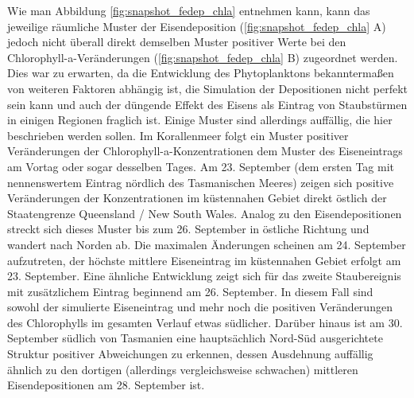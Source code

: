 \documentclass[12pt,a4paper,onecolumn,draft]{scrartcl}
\begin{document}
Wie man Abbildung \ref{fig:snapshot_fedep_chla} entnehmen kann, kann das jeweilige räumliche Muster der Eisendeposition (\ref{fig:snapshot_fedep_chla} A) jedoch nicht überall direkt demselben Muster positiver Werte bei den Chlorophyll-a-Veränderungen (\ref{fig:snapshot_fedep_chla} B) zugeordnet werden. Dies war zu erwarten, da die Entwicklung des Phytoplanktons bekanntermaßen von weiteren Faktoren abhängig ist, die Simulation der Depositionen nicht perfekt sein kann und auch der düngende Effekt des Eisens als Eintrag von Staubstürmen in einigen Regionen fraglich ist. Einige Muster sind allerdings auffällig, die hier beschrieben werden sollen. Im Korallenmeer folgt ein Muster positiver Veränderungen der Chlorophyll-a-Konzentrationen dem Muster des Eiseneintrags am Vortag oder sogar desselben Tages. Am 23. September (dem ersten Tag mit nennenswertem Eintrag nördlich des Tasmanischen Meeres) zeigen sich positive Veränderungen der Konzentrationen im küstennahen Gebiet direkt östlich der Staatengrenze Queensland / New South Wales. Analog zu den Eisendepositionen streckt sich dieses Muster bis zum 26. September in östliche Richtung und wandert nach Norden ab. Die maximalen Änderungen scheinen am 24. September aufzutreten, der höchste mittlere Eiseneintrag im küstennahen Gebiet erfolgt am 23. September. Eine ähnliche Entwicklung zeigt sich für das  zweite Staubereignis mit zusätzlichem Eintrag beginnend am 26. September. In diesem Fall sind sowohl der simulierte Eiseneintrag und mehr noch die positiven Veränderungen des Chlorophylls im gesamten Verlauf etwas südlicher. Darüber hinaus ist am 30. September südlich von Tasmanien eine hauptsächlich Nord-Süd ausgerichtete Struktur positiver Abweichungen zu erkennen, dessen Ausdehnung auffällig ähnlich zu den dortigen (allerdings vergleichsweise schwachen) mittleren Eisendepositionen am 28. September ist. \\
\end{document}
